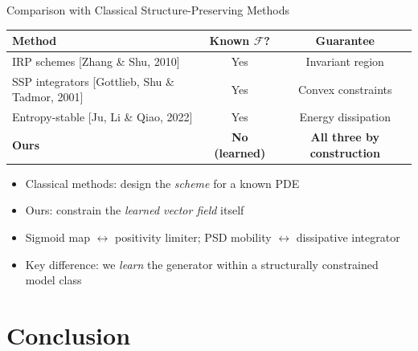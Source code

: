 \documentclass[aspectratio=169, 11pt]{beamer}
\newcommand{\cF}{\mathcal{F}}
\begin{document}
\begin{frame}{Comparison with Classical Structure-Preserving Methods}

\begin{center}
\small
\begin{tabular}{lcc}
\toprule
\textbf{Method} & \textbf{Known $\cF$?} & \textbf{Guarantee} \\
\midrule
IRP schemes [Zhang \& Shu, 2010] & Yes & Invariant region \\
SSP integrators [Gottlieb, Shu \& Tadmor, 2001] & Yes & Convex constraints \\
Entropy-stable [Ju, Li \& Qiao, 2022] & Yes & Energy dissipation \\
\midrule
\textbf{Ours} & \textbf{No (learned)} & \textbf{All three by construction} \\
\bottomrule
\end{tabular}
\end{center}

\vspace{0.3cm}
\begin{itemize}
    \item Classical methods: design the \emph{scheme} for a known PDE
    \item Ours: constrain the \emph{learned vector field} itself
    \item Sigmoid map $\leftrightarrow$ positivity limiter; PSD mobility $\leftrightarrow$ dissipative integrator
    \item Key difference: we \emph{learn} the generator within a structurally constrained model class
\end{itemize}
\end{frame}

\section{Conclusion}
\end{document}
